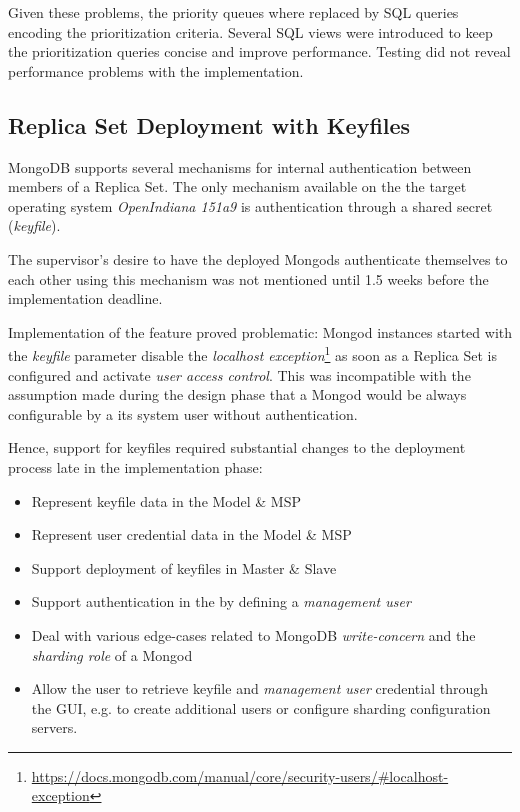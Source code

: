 Given these problems, the priority queues where replaced by SQL queries encoding the prioritization criteria.
Several SQL views were introduced to keep the prioritization queries concise and improve performance.
Testing did not reveal performance problems with the  implementation.

\subsection{Replica Set Deployment with Keyfiles}\label{di:keyfiles}

MongoDB supports several mechanisms for internal authentication between members of a Replica Set. The only mechanism available on the
the target operating system \textit{OpenIndiana 151a9} is authentication through a shared secret (\textit{keyfile}).

The supervisor's desire to have the deployed Mongods authenticate themselves to each other using this mechanism was not mentioned 
until 1.5 weeks before the implementation deadline. %

Implementation of the feature proved problematic: Mongod instances started with the \textit{keyfile} parameter disable the 
\textit{localhost exception}\footnote{\url{https://docs.mongodb.com/manual/core/security-users/\#localhost-exception}}
as soon as a Replica Set is configured and activate \textit{user access control}. %
This was incompatible with the assumption made during the design phase that a Mongod would be always configurable by a its system user without authentication.

Hence, support for keyfiles required substantial changes to the deployment process late in the implementation phase:

\begin{itemize}
  \item Represent keyfile data in the Model \& MSP
  \item Represent user credential data in the Model \& MSP
  \item Support deployment of keyfiles in Master \& Slave
  \item Support authentication in the  by defining a \textit{management user}
  \item Deal with various edge-cases related to MongoDB \textit{write-concern} and the \textit{sharding role} of a Mongod
  \item Allow the user to retrieve keyfile and \textit{management user} credential through the GUI,
        e.g. to create additional users or configure sharding configuration servers.
\end{itemize}

